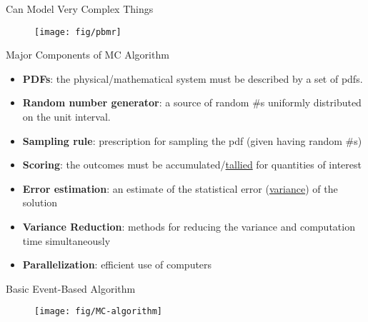 \documentclass[xcolor=x11names,compress]{beamer}
\renewcommand{\(}{\begin{columns}}
\renewcommand{\)}{\end{columns}}
\newcommand{\<}[1]{\begin{column}{#1}}
\renewcommand{\>}{\end{column}}
\begin{document}
\begin{frame}{Can Model Very Complex Things}

  	\begin{figure}
  	\begin{center}
  		\texttt{[image: fig/pbmr]}
	\end{center}
  	\end{figure}

\end{frame}

\begin{frame}{Major Components of MC Algorithm}

\begin{itemize}
  \item \textbf{PDFs}: the physical/mathematical system must be described by a set of pdfs.
  
  \item \textbf{Random number generator}: a source of random \#s uniformly distributed on the unit interval.
  
  \item \textbf{Sampling rule}: prescription for sampling the pdf (given having random \#s)
  
  \item \textbf{Scoring}: the outcomes must be accumulated/\underline{tallied} for quantities of interest
  
  \item \textbf{Error estimation}: an estimate of the statistical error (\underline{variance}) of the solution
    
  \item \textbf{Variance Reduction}: methods for reducing the variance and computation time simultaneously
    
  \item \textbf{Parallelization}: efficient use of computers
\end{itemize}
\end{frame}



\begin{frame}{Basic Event-Based Algorithm}

\begin{figure}[h!]
\begin{center}
  \texttt{[image: fig/MC-algorithm]}
\end{center}
  \label{fig:mc-algo}
\end{figure}

\end{frame}
\end{document}
